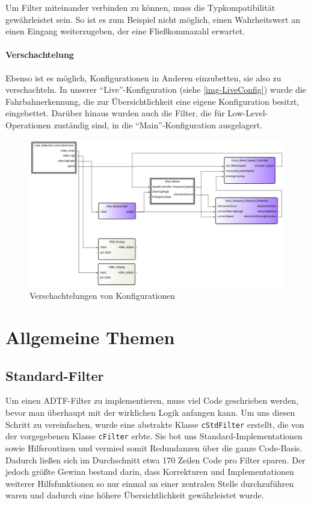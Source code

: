\documentclass[a4paper,12pt]{report}
\begin{document}
	Um Filter miteinander verbinden zu können, muss die Typkompatibilität gewährleistet sein.
	So ist es zum Beispiel nicht möglich, einen Wahrheitswert an einen Eingang weiterzugeben, der eine Fließkommazahl erwartet.

\subsubsection{Verschachtelung}

	Ebenso ist es möglich, Konfigurationen in Anderen einzubetten, sie also zu verschachteln.
	In unserer ``Live''-Konfiguration (siehe \autoref{img-LiveConfig}) wurde die Fahrbahnerkennung, die zur Übersichtlichkeit eine eigene Konfiguration besitzt, eingebettet.
	Darüber hinaus wurden auch die Filter, die für Low-Level-Operationen zuständig sind, in die ``Main''-Konfiguration ausgelagert.

	\begin{figure}[ht]
		\centering
		\includegraphics[width=\textwidth, height=\textheight, keepaspectratio]{assets/LiveConfig}
		\caption{Verschachtelungen von Konfigurationen}
		\label{img-LiveConfig}
	\end{figure}

\chapter{Allgemeine Themen}
\section{Standard-Filter}

	Um einen ADTF-Filter zu implementieren, muss viel Code geschrieben werden, bevor man überhaupt mit der wirklichen Logik anfangen kann. %
	Um uns diesen Schritt zu vereinfachen, wurde eine abstrakte Klasse \texttt{cStdFilter} erstellt, die von der vorgegebenen Klasse \texttt{cFilter} erbte.
	Sie bot uns Standard-Implementationen sowie Hilfsroutinen und vermied somit Redundanzen über die ganze Code-Basis.
	Dadurch ließen sich im Durchschnitt etwa 170 Zeilen Code pro Filter sparen.
	Der jedoch größte Gewinn bestand darin, dass Korrekturen und Implementationen weiterer Hilfsfunktionen so nur einmal an einer zentralen Stelle durchzuführen waren und dadurch eine höhere Übersichtlichkeit gewährleistet wurde.
\end{document}
